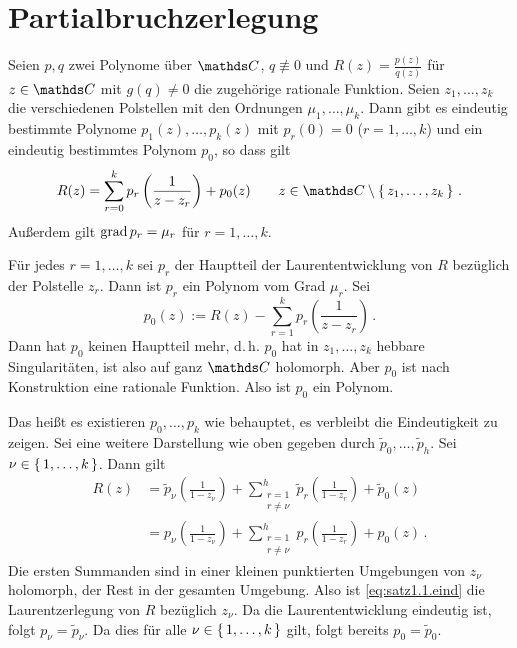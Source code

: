 \section{Partialbruchzerlegung}

\begin{satz}
Seien $p, q$ zwei Polynome über $\CC$, $q \not\equiv 0$ und $R(z) = \frac{p(z)}{q(z)}$ für $z\in\CC$ mit $g(q)\not=0$ die zugehörige rationale Funktion.
Seien $z_1, \ldots, z_k$ die verschiedenen Polstellen mit den Ordnungen $\mu_1,\ldots, \mu_k$.
Dann gibt es eindeutig bestimmte Polynome $p_1(z), \ldots, p_k(z)$ mit $p_r(0) = 0$ ($r=1,\ldots,k$) und ein eindeutig bestimmtes Polynom $p_0$, so dass gilt
\[
	R(z)
	= \sum_{r=0}^k p_r\left(\frac{1}{z-z_r}\right) + p_0(z)
	\qquad z \in \CC\setminus\Set{z_1, \ldots, z_k}
	\,.
\]
Außerdem gilt $\operatorname{grad} p_r = \mu_r$ für $r=1,\ldots,k$.
\end{satz}

\begin{bewe}
Für jedes $r=1,\ldots,k$ sei $p_r$ der Hauptteil der Laurententwicklung von $R$ bezüglich der Polstelle $z_r$.
Dann ist $p_r$ ein Polynom vom Grad $\mu_r$.
Sei
\[
	p_0(z) := R(z) - \sum_{r=1}^k p_r\left(\frac{1}{z-z_r}\right)\,.
\]
Dann hat $p_0$ keinen Hauptteil mehr, d.\,h. $p_0$ hat in $z_1,\ldots,z_k$ hebbare Singularitäten, ist also auf ganz $\CC$ holomorph.
Aber $p_0$ ist nach Konstruktion eine rationale Funktion.
Also ist $p_0$ ein Polynom.

Das heißt es existieren $p_0, \ldots, p_k$ wie behauptet, es verbleibt die Eindeutigkeit zu zeigen. Sei eine weitere Darstellung wie oben gegeben durch $\tilde{p}_0, \ldots, \tilde{p}_h$.
Sei $\nu \in \left\{\,1,\ldots,k\,\right\}$.
Dann gilt
\begin{align}\label{eq:satz1.1.eind}
	R(z)
	&= \tilde{p}_\nu\left(\frac{1}{1-z_\nu}\right) + \sum_{\substack{r=1\\\scriptscriptstyle r\not=\nu}}^h \tilde{p}_r\left(\frac{1}{1-z_r}\right) + \tilde{p}_0(z) \\
	&= p_\nu\left(\frac{1}{1-z_\nu}\right) + \sum_{\substack{r=1\\\scriptscriptstyle r\not=\nu}}^h p_r\left(\frac{1}{1-z_r}\right) + p_0(z)
	\,. \nonumber
\end{align}
Die ersten Summanden sind in einer kleinen punktierten Umgebungen von $z_\nu$ holomorph, der Rest in der gesamten Umgebung.
Also ist \eqref{eq:satz1.1.eind} die Laurentzerlegung von $R$ bezüglich $z_\nu$.
Da die Laurententwicklung eindeutig ist, folgt $p_\nu = \tilde{p}_\nu$.
Da dies für alle $\nu \in \left\{\,1,\ldots,k\,\right\}$ gilt, folgt bereits $p_0 = \tilde{p}_0$.
\end{bewe}

